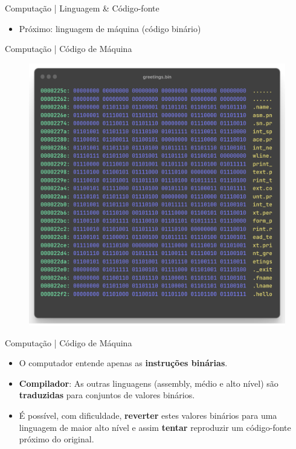 \documentclass{beamer}
\begin{document}
\begin{frame}{Computação | Linguagem \& Código-fonte}
    \begin{itemize}
        \item Próximo: linguagem de máquina (código binário)
    \end{itemize}
\end{frame}

\begin{frame}{Computação | Código de Máquina}
    \begin{figure}
        \centering
        \includegraphics[width=0.6\linewidth]{img/greetings-code/greetings-bin.png}
    \end{figure}
\end{frame}

\begin{frame}{Computação | Código de Máquina}
    \begin{itemize}
        \item O computador entende apenas as \textbf{instruções binárias}.
        \item \textbf{Compilador}: As outras linguagens (assembly, médio e alto nível) são \textbf{traduzidas} para conjuntos de valores binários.
        \item É possível, com dificuldade, \textbf{reverter} estes valores binários para uma linguagem de maior alto nível e assim \textbf{tentar} reproduzir um código-fonte próximo do original. 
    \end{itemize}
\end{frame}
\end{document}
